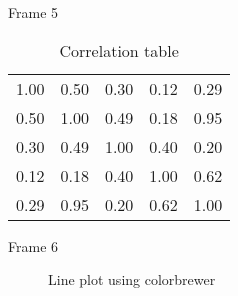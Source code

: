 \documentclass[10pt]{beamer}
\begin{document}
\begin{frame}{Frame 5}
    \begin{table}
        \begin{center}
        \caption{Correlation table}
            \begin{tabular}{*{5}{R}}
              1.00 & 0.50 & 0.30 & 0.12 & 0.29 \\
              0.50 & 1.00 & 0.49 & 0.18 & 0.95 \\
              0.30 & 0.49 & 1.00 & 0.40 & 0.20 \\
              0.12 & 0.18 & 0.40 & 1.00 & 0.62 \\
              0.29 & 0.95 & 0.20 & 0.62 & 1.00 \\
            \end{tabular}
        \end{center}
    \end{table}
\end{frame}
\begin{frame}{Frame 6}
    \begin{figure}
        \caption{Line plot using colorbrewer}
        \centering
    \end{figure}
\end{frame}
\end{document}
